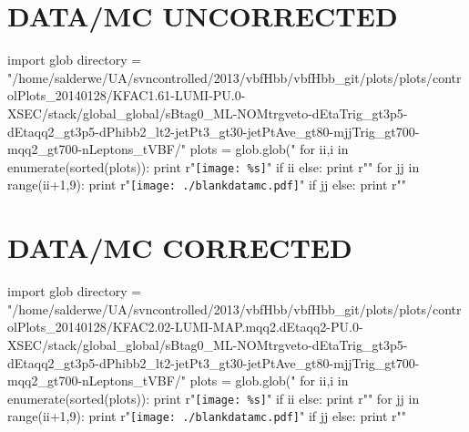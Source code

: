\documentclass[12pt,english,dvipsnames]{beamer}
\newcommand{\UAoverlay}[0]{%
\begin{tikzpicture}[remember picture,overlay,shift={(current page.north east)}]
\node (zero) at (-1.8cm,-0.93cm) {\texttt{[image: ../logos/CMS.pdf]}\hspace{0.15cm}\texttt{[image: ../logos/CERN.pdf]}\hspace{0.15cm}\texttt{[image: ../logos/UA.pdf]}}; 
\end{tikzpicture}
}
\begin{document}
\section{\tiny DATA/MC UNCORRECTED}
\begin{frame}[t,fragile]%
\begin{python}
import glob
directory = "/home/salderwe/UA/svncontrolled/2013/vbfHbb/vbfHbb_git/plots/plots/controlPlots_20140128/KFAC1.61-LUMI-PU.0-XSEC/stack/global_global/sBtag0_ML-NOMtrgveto-dEtaTrig_gt3p5-dEtaqq2_gt3p5-dPhibb2_lt2-jetPt3_gt30-jetPtAve_gt80-mjjTrig_gt700-mqq2_gt700-nLeptons_tVBF/"
plots = glob.glob("%
for ii,i in enumerate(sorted(plots)):
  print r"\texttt{[image: \%s]}"%
  if ii%
  else: print r"\hfill"
for jj in range(ii+1,9):
  print r"\texttt{[image: ./blankdatamc.pdf]}"
  if jj%
  else: print r"\hfill"
\end{python}

\end{frame}
\section{\tiny DATA/MC CORRECTED}
\begin{frame}[t,fragile]%
\begin{python}
import glob
directory = "/home/salderwe/UA/svncontrolled/2013/vbfHbb/vbfHbb_git/plots/plots/controlPlots_20140128/KFAC2.02-LUMI-MAP.mqq2.dEtaqq2-PU.0-XSEC/stack/global_global/sBtag0_ML-NOMtrgveto-dEtaTrig_gt3p5-dEtaqq2_gt3p5-dPhibb2_lt2-jetPt3_gt30-jetPtAve_gt80-mjjTrig_gt700-mqq2_gt700-nLeptons_tVBF/"
plots = glob.glob("%
for ii,i in enumerate(sorted(plots)):
  print r"\texttt{[image: \%s]}"%
  if ii%
  else: print r"\hfill"
for jj in range(ii+1,9):
  print r"\texttt{[image: ./blankdatamc.pdf]}"
  if jj%
  else: print r"\hfill"
\end{python}

\end{frame}

\end{document}
